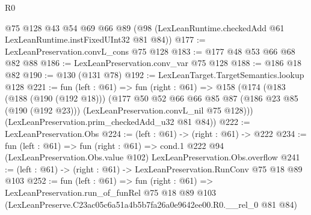 \begin{lexlean}{R0}
\begin{coremodule}
    @75
    @128
    @43
    @54
    @69
    @66
    @89
    (@98 (LexLeanRuntime.checkedAdd @61 LexLeanRuntime.instFixedUInt32 @81 @84))
@177 := LexLeanPreservation.convL_cons @75 @128
@183 := @177 @48 @53 @66 @68 @82 @88
@186 := LexLeanPreservation.conv_var @75 @128
@188 := @186 @18 @82
@190 := @130 (@131 @78)
@192 := LexLeanTarget.TargetSemantics.lookup @128
@221 := fun (left : @61) =>
  fun (right : @61) =>
  @158
    (@174
      (@183
        (@188 (@190 (@192 @18)))
        (@177
          @50
          @52
          @66
          @66
          @85
          @87
          (@186 @23 @85 (@190 (@192 @23)))
          (LexLeanPreservation.convL_nil @75 @128)))
      (LexLeanPreservation.prim_checkedAdd_u32 @81 @84))
@222 := LexLeanPreservation.Obs
@224 := (left : @61) -> (right : @61) -> @222
@234 := fun (left : @61) =>
  fun (right : @61) =>
  cond.{1} @222 @94 (LexLeanPreservation.Obs.value @102) LexLeanPreservation.Obs.overflow
@241 := (left : @61) -> (right : @61) -> LexLeanPreservation.RunConv @75 @18 @89 @103
@252 := fun (left : @61) =>
  fun (right : @61) =>
  LexLeanPreservation.run_of_funRel
    @75
    @18
    @89
    @103
    (LexLeanPreserve.C23ac05c6a51a4b5b7fa26a0e9642ee00.R0.__rel_0 @81 @84)
\end{coremodule}
\end{lexlean}
